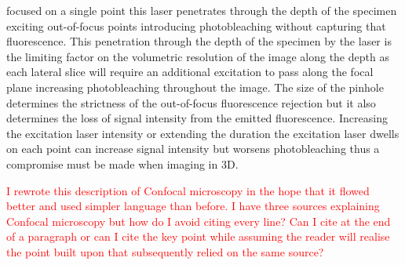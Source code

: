focused on a single point this laser penetrates through the depth of the specimen exciting out-of-focus points introducing photobleaching without capturing that fluorescence. This penetration through the depth of the specimen by the laser is the limiting factor on the volumetric resolution of the image along the depth as each lateral slice will require an additional excitation to pass along the focal plane increasing photobleaching throughout the image. The size of the pinhole determines the strictness of the out-of-focus fluorescence rejection but it also determines the loss of signal intensity from the emitted fluorescence. Increasing the excitation laser intensity or extending the duration the excitation laser dwells on each point can increase signal intensity but worsens photobleaching thus a compromise must be made when imaging in 3D.\par
\textcolor{red}{I rewrote this description of Confocal microscopy in the hope that it flowed better and used simpler language than before. I have three sources explaining Confocal microscopy but how do I avoid citing every line? Can I cite at the end of a paragraph or can I cite the key point while assuming the reader will realise the point built upon that subsequently relied on the same source?}

